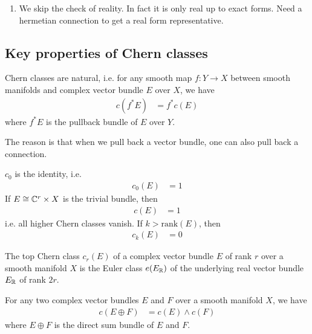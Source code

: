 \documentclass[12pt]{article}
\begin{document}
\begin{enumerate}
Returning to our computation, the first term vanishes by the Bianchi identity, so we get that \begin{align*}
        \frac{d}{dt} \tr(F_t^k) & = k d \tr(F_t^{k-1} \wedge \dot A_t)
    \end{align*} which is exact. Thus the Chern classes are independent of the choice of connection.
    \item We skip the check of reality. In fact it is only real up to exact forms. Need a hermetian connection to get a real form representative.
\end{enumerate}

\subsection{Key properties of Chern classes}
\begin{proposition}
    Chern classes are natural, i.e. for any smooth map $f: Y \to X$ between smooth manifolds and complex vector bundle $E$ over $X$, we have \begin{align*}
        c(f^* E) & = f^* c(E)
    \end{align*} where $f^* E$ is the pullback bundle of $E$ over $Y$.
\end{proposition}
The reason is that when we pull back a vector bundle, one can also pull back a connection.

\begin{proposition}
    $c_0$ is the identity, i.e. \begin{align*}
        c_0(E) & = 1
    \end{align*} If $E \cong \mathbb{C}^r \times X$ is the trivial bundle, then \begin{align*}
        c(E) & = 1
    \end{align*} i.e. all higher Chern classes vanish. If $k > \text{rank}(E)$, then \begin{align*}
        c_k(E) & = 0
    \end{align*}
\end{proposition}

\begin{proposition}
    The top Chern class $c_r(E)$ of a complex vector bundle $E$ of rank $r$ over a smooth manifold $X$ is the Euler class $e(E_{\mathbb{R}})$ of the underlying real vector bundle $E_{\mathbb{R}}$ of rank $2r$.
\end{proposition}

\begin{proposition}
     For any two complex vector bundles $E$ and $F$ over a smooth manifold $X$, we have \begin{align*}
        c(E \oplus F) & = c(E) \wedge c(F)
    \end{align*} where $E \oplus F$ is the direct sum bundle of $E$ and $F$.
\end{proposition}
\end{document}
